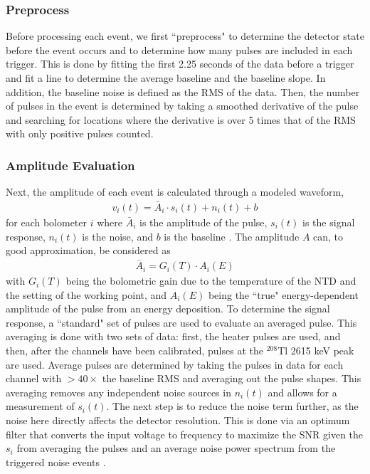 \subsubsection*{Preprocess}
Before processing each event, we first ``preprocess" to determine the detector state before the event occurs and to determine how many pulses are included in each trigger.
This is done by fitting the first 2.25 seconds of the data before a trigger and fit a line to determine the average baseline and the baseline slope.
In addition, the baseline noise is defined as the RMS of the data.
Then, the number of pulses in the event is determined by taking a smoothed derivative of the pulse and searching for locations where the derivative is over 5 times that of the RMS with only positive pulses counted.

\subsubsection*{Amplitude Evaluation}
Next, the amplitude of each event is calculated through a modeled waveform,
\begin{align}
    v_i(t) = \bar{A}_i\cdot s_i(t) + n_i(t) + b
    \label{eq:pulse function}
\end{align}
for each bolometer $i$ where $\bar{A}_i$ is the amplitude of the pulse, $s_i(t)$ is the signal response, $n_i(t)$ is the noise, and $b$ is the baseline \cite{Alduino:2016zrl}.
The amplitude $A$ can, to good approximation, be considered as
\begin{align}
    \bar{A}_i = G_i(T)\cdot A_i(E)
\end{align}
with $G_i(T)$ being the bolometric gain due to the temperature of the NTD and the setting of the working point, and $A_i(E)$ being the ``true" energy-dependent amplitude of the pulse from an energy deposition.
To determine the signal response, a ``standard" set of pulses are used to evaluate an averaged pulse.
This averaging is done with two sets of data: first, the heater pulses are used, and then, after the channels have been calibrated, pulses at the $^{208}$Tl 2615 keV peak are used.
Average pulses are determined by taking the pulses in data for each channel with $>40\times$ the baseline RMS and averaging out the pulse shapes.
This averaging removes any independent noise sources in $n_i(t)$ and allows for a measurement of $s_i(t)$.
The next step is to reduce the noise term further, as the noise here directly affects the detector resolution.
This is done via an optimum filter that converts the input voltage to frequency to maximize the SNR given the $s_i$ from averaging the pulses and an average noise power spectrum from the triggered noise events \cite{Gatti1986}.
